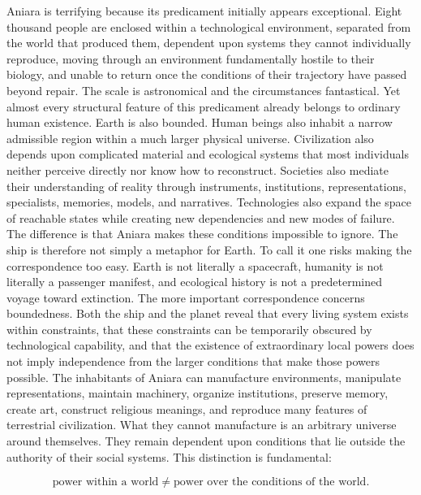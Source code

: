\documentclass[11pt,oneside]{book}
\theoremstyle{definition}
\theoremstyle{remark}
\begin{document}
Aniara is terrifying because its predicament initially appears exceptional. Eight thousand people
are enclosed within a technological environment, separated from the world that produced them,
dependent upon systems they cannot individually reproduce, moving through an environment
fundamentally hostile to their biology, and unable to return once the conditions of their trajectory
have passed beyond repair. The scale is astronomical and the circumstances fantastical. Yet almost
every structural feature of this predicament already belongs to ordinary human existence. Earth is
also bounded. Human beings also inhabit a narrow admissible region within a much larger physical
universe. Civilization also depends upon complicated material and ecological systems that most
individuals neither perceive directly nor know how to reconstruct. Societies also mediate their
understanding of reality through instruments, institutions, representations, specialists, memories,
models, and narratives. Technologies also expand the space of reachable states while creating new
dependencies and new modes of failure. The difference is that Aniara makes these conditions
impossible to ignore. The ship is therefore not simply a metaphor for Earth. To call it one risks
making the correspondence too easy. Earth is not literally a spacecraft, humanity is not literally a
passenger manifest, and ecological history is not a predetermined voyage toward extinction. The more
important correspondence concerns boundedness. Both the ship and the planet reveal that every living
system exists within constraints, that these constraints can be temporarily obscured by
technological capability, and that the existence of extraordinary local powers does not imply
independence from the larger conditions that make those powers possible. The inhabitants of Aniara
can manufacture environments, manipulate representations, maintain machinery, organize institutions,
preserve memory, create art, construct religious meanings, and reproduce many features of
terrestrial civilization. What they cannot manufacture is an arbitrary universe around themselves.
They remain dependent upon conditions that lie outside the authority of their social systems. This
distinction is fundamental:

\[
\text{power within a world} \neq \text{power over the conditions of the world}.
\]
\end{document}
